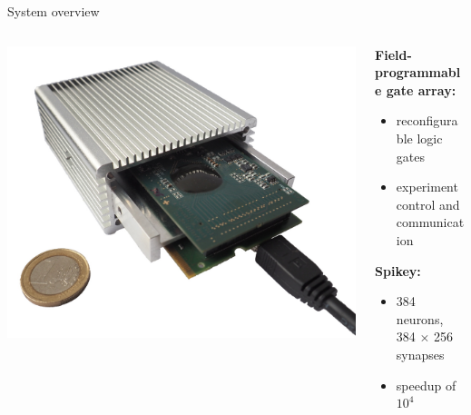 \documentclass[aspectratio=169]{beamer}
\begin{document}
\begin{frame}{System overview}
	\begin{columns}[onlytextwidth]
		\begin{column}{0.40\textwidth}
			\includegraphics[width=\textwidth]{assets/spikey_system.png}
			\vspace{2ex}
			\begin{center}
			\end{center}
		\end{column}
		\hfill
		\begin{column}{0.50\textwidth}
			
			\textbf{Field-programmable gate array:}
			\begin{itemize}
				\item reconfigurable logic gates
				\item experiment control and communication
			\end{itemize}
			
			\vspace{3ex}

			\textbf{Spikey:}
			\begin{itemize}
				\item 384 neurons, 384 $\times$ 256 synapses
				\item speedup of $10^4$
			\end{itemize}
		\end{column}
	\end{columns}
\end{frame}
\end{document}

